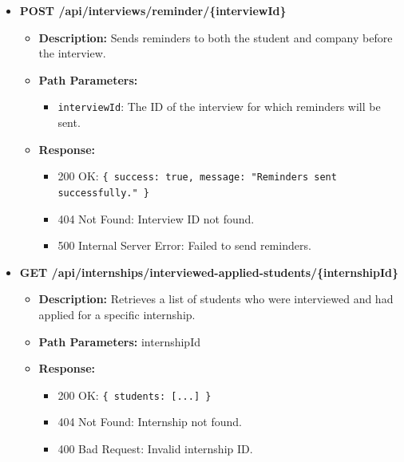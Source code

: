 \begin{itemize}
    \item \textbf{POST /api/interviews/reminder/\{interviewId\}}  
    \begin{itemize}
        \item \textbf{Description:} Sends reminders to both the student and company before the interview.
        \item \textbf{Path Parameters:} 
        \begin{itemize}
            \item \texttt{interviewId}: The ID of the interview for which reminders will be sent.
        \end{itemize}
        \item \textbf{Response:}
        \begin{itemize}
            \item 200 OK: \texttt{\{ success: true, message: "Reminders sent successfully." \}}
            \item 404 Not Found: Interview ID not found.
            \item 500 Internal Server Error: Failed to send reminders.
        \end{itemize}
    \end{itemize}

    \item \textbf{GET /api/internships/interviewed-applied-students/\{internshipId\}}  
    \begin{itemize}
        \item \textbf{Description:} Retrieves a list of students who were interviewed and had applied for a specific internship.
        \item \textbf{Path Parameters:} internshipId  
        \item \textbf{Response:}
        \begin{itemize}
            \item 200 OK: \texttt{\{ students: [...] \}}
            \item 404 Not Found: Internship not found.
            \item 400 Bad Request: Invalid internship ID.
        \end{itemize}
    \end{itemize}


\end{itemize}
